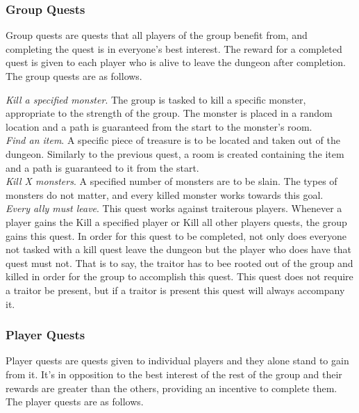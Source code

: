 \documentclass[a4paper]{article}
\begin{document}
\subsubsection{Group Quests}
Group quests are quests that all players of the group benefit from, and completing the quest is in everyone's best interest. The reward for a completed quest is given to each player who 
is alive to leave the dungeon after completion. The group quests are as follows.

\textit{Kill a specified monster}. The group is tasked to kill a specific monster, appropriate to the strength of the group. The monster is placed in a random location and a path is 
guaranteed from the start to the monster's room.\\
\textit{Find an item}. A specific piece of treasure is to be located and taken out of the dungeon. Similarly to the previous quest, a room is created containing the item and a path is 
guaranteed to it from the start.\\
\textit{Kill X monsters}. A specified number of monsters are to be slain. The types of monsters do not matter, and every killed monster works towards this goal.\\
\textit{Every ally must leave}. This quest works against traiterous players. Whenever a player gains the Kill a specified player or Kill all other players quests, the group gains this quest.
In order for this quest to be completed, not only does everyone not tasked with a kill quest leave the dungeon but the player who does have that quest must not. That is to say, the 
traitor has to bee rooted out of the group and killed in order for the group to accomplish this quest. This quest does not require a traitor be present, but if a traitor is present this 
quest will always accompany it.
\subsubsection{Player Quests}
Player quests are quests given to individual players and they alone stand to gain from it. It's in opposition to the best interest of the rest of the group and their rewards are 
greater than the others, providing an incentive to complete them. The player quests are as follows.
\end{document}
